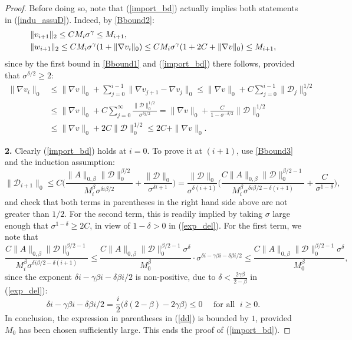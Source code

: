 \documentclass[reqno,twoside,11pt]{amsart}
\numberwithin{equation}{section}
\theoremstyle{plain}
\theoremstyle{definition}
\begin{document}
\begin{proof}
\smallskip

Before doing so, note that (\ref{import_bd}) actually implies both
statements in (\ref{indu_assuD}). Indeed, by \ref{Bbound2}:
\begin{equation*}
\begin{split}
& \|v_{i+1}\|_2\leq CM_i\sigma^\gamma\leq M_{i+1},\vspace{1mm}\\
& \|w_{i+1}\|_2\leq CM_i\sigma^\gamma(1+\|\nabla v_i\|_0) 
\leq CM_i\sigma^\gamma(1+2C +\|\nabla v\|_0) \leq M_{i+1},
\end{split}
\end{equation*}
since by the first bound in \ref{Bbound1} and (\ref{import_bd}) there
follows, provided that $\sigma^{\delta/2}\geq 2$:
\begin{equation}\label{pomoc_v}
\begin{split}
\|\nabla v_i\|_0 & \leq \|\nabla v\|_0 + \sum_{j=0}^{i-1}\|\nabla v_{j+1}-\nabla v_j\|_0
\leq \|\nabla v\|_0 + C\sum_{j=0}^{i-1}\|\mathcal{D}_j\|_0^{1/2} \\ & \leq 
\|\nabla v\|_0 + C\sum_{j=0}^{\infty}\frac{\|\mathcal{D}\|_0^{1/2}}{\sigma^{\delta j/2}} 
= \|\nabla v\|_0 + \frac{C}{1-\sigma^{-\delta/2}} \|\mathcal{D}\|_0^{1/2}
\\ & \leq \|\nabla v\|_0 + {2C} \|\mathcal{D}\|_0^{1/2} \leq 2C +\|\nabla v\|_0.
\end{split}
\end{equation}

\medskip

{\bf 2.} Clearly (\ref{import_bd}) holds at $i=0$. To prove
it at $(i+1)$, use \ref{Bbound3} and the induction assumption:
\begin{equation}\label{dd}
\|\mathcal{D}_{i+1}\|_0\leq C\Big( \frac{\|A\|_{0,\beta}
  \|\mathcal{D}\|_0^{\beta/2}}{M_i^\beta\sigma^{\delta i\beta/2}} +
\frac{\|\mathcal{D}\|_0}{\sigma^{\delta i +1}}\Big) = \frac{\|\mathcal{D}\|_{0}}{\sigma^{\delta(i+1)}}
\Big(\frac{C\|A\|_{0,\beta} \|\mathcal{D}\|_0^{\beta/2-1}}{M_i^\beta\sigma^{\delta i\beta/2 - \delta(i+1)}} +
\frac{C}{\sigma^{1-\delta}}\Big),
\end{equation}
and check that both terms in parentheses in the right hand side above
are not greater than $1/2$. For the second term, this is readily implied by
taking $\sigma$ large enough that $\sigma^{1-\delta}\geq 2C$, in view
of $1-\delta>0$ in (\ref{exp_del}). For the first term, we note that
$$\frac{C\|A\|_{0,\beta} \|\mathcal{D}\|_0^{\beta/2-1}}{M_i^\beta\sigma^{\delta i\beta/2 -  \delta(i+1)}} 
\leq \frac{C\|A\|_{0,\beta} \|\mathcal{D}\|_0^{\beta/2-1}\sigma^\delta}{M_0^\beta}
\cdot \sigma^{\delta i-\gamma\beta i - \delta\beta i/2} \leq \frac{C\|A\|_{0,\beta}
    \|\mathcal{D}\|_0^{\beta/2-1}\sigma^\delta}{M_0^\beta},$$  
since the exponent $\delta i-\gamma\beta i - \delta\beta i/2$ is
non-positive, due to $\delta < \frac{2\gamma\beta}{2-\beta}$ in (\ref{exp_del}):
$$\delta i-\gamma\beta i - \delta\beta i/2 =\frac{i}{2}
\big(\delta(2 - \beta) - 2\gamma\beta \big) \leq 0 \quad\mbox{ for all }\; i\geq 0.$$
In conclusion, the expression in parentheses in (\ref{dd}) is bounded
by $1$, provided $M_0$ has been chosen sufficiently large. This ends the proof of (\ref{import_bd}).


\end{proof}
\end{document}

